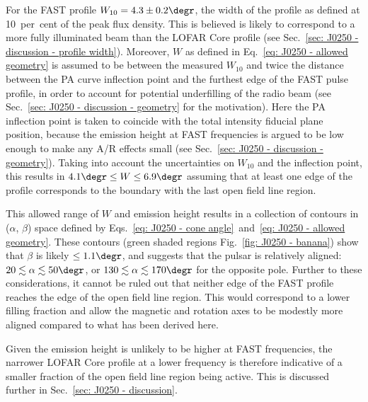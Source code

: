 For the FAST profile $W_{10}=4.3\pm0.2\degr$, the width of the profile as defined at 10~per~cent of the peak flux density. This is believed is likely to correspond to a more fully illuminated beam than the LOFAR Core profile (see Sec.~\ref{sec: J0250 - discussion - profile width}). Moreover, $W$ as defined in Eq.~\eqref{eq: J0250 - allowed geometry} is assumed to be between the measured $W_{10}$ and twice the distance between the PA curve inflection point and the furthest edge of the FAST pulse profile, in order to account for potential underfilling of the radio beam (see Sec.~\ref{sec: J0250 - discussion - geometry} for the motivation). Here the PA inflection point is taken to coincide with the total intensity fiducial plane position, because the emission height at FAST frequencies is argued to be low enough to make any A/R effects small (see Sec.~\ref{sec: J0250 - discussion - geometry}). Taking into account the uncertainties on $W_{10}$ and the inflection point, this results in $4.1\degr \leq W \leq 6.9\degr$ assuming that at least one edge of the profile corresponds to the boundary with the last open field line region.

This allowed range of $W$ and emission height results in a collection of contours in ($\alpha$, $\beta$) space defined by Eqs.~\eqref{eq: J0250 - cone angle}~and~\eqref{eq: J0250 - allowed geometry}. These contours (green shaded regions Fig.~\ref{fig: J0250 - banana}) show that $\beta$ is likely $\leq1.1\degr$, and suggests that the pulsar is relatively aligned: $20 \lesssim \alpha \lesssim 50\degr$, or $130 \lesssim \alpha \lesssim 170\degr$ for the opposite pole. Further to these considerations, it cannot be ruled out that neither edge of the FAST profile reaches the edge of the open field line region. This would correspond to a lower filling fraction and allow the magnetic and rotation axes to be modestly more aligned compared to what has been derived here. 

Given the emission height is unlikely to be higher at FAST frequencies, the narrower LOFAR Core profile at a lower frequency is therefore indicative of a smaller fraction of the open field line region being active. This is discussed further in Sec.~\ref{sec: J0250 - discussion}.
























